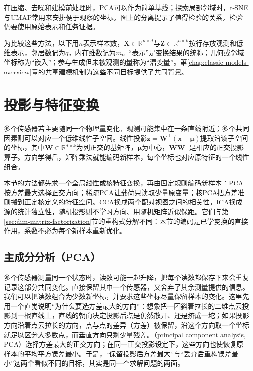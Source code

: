 在压缩、去噪和建模前处理时，PCA可以作为简单基线；探索局部邻域时，t-SNE与UMAP常用来安排便于观察的坐标。图上的分离提示了值得检验的关系，检验仍要使用原始表示和任务证据。

为比较这些方法，以下用$n$表示样本数，$\bm{X}\in\mathbb{R}^{n\times d}$与$\bm{Z}\in\mathbb{R}^{n\times k}$按行存放观测和低维表示，邻居数记为$q$，内在维数记为$m$。“表示”是变换结果的统称；几何或邻域坐标称为“嵌入”；参与生成但未被观测的量称为“潜变量”。第\ref{chap:classic-models-overview}章的共享建模机制为这些不同目标提供了共同背景。

\section{投影与特征变换}
\label{sec:dim-linear}

多个传感器若主要随同一个物理量变化，观测可能集中在一条直线附近；多个共同因素则可以对应一个低维线性子空间。线性投影$\bm{z}=\bm{W}^{\top}(\bm{x}-\bm{\mu})$提取沿该子空间的坐标，其中$\bm{W}\in\mathbb{R}^{d\times k}$为列正交的基矩阵，$\bm{\mu}$为中心，$\bm{W}\bm{W}^{\top}$是相应的正交投影算子。方向学得后，矩阵乘法就能编码新样本，每个坐标也对应原特征的一个线性组合。

本节的方法都先求一个全局线性或核特征变换，再由固定规则编码新样本：PCA按方差最大选择正交方向；稀疏PCA让载荷只读取少量原变量；核PCA把方差准则搬到正定核定义的特征空间。CCA换成两个配对视图之间的相关性，ICA换成源的统计独立性，随机投影则不学习方向、用随机矩阵近似保距。它们与第\ref{sec:dim-matrix-factorization}节的重构式分解不同：本节的编码是已学变换的直接作用，系数不必为每个新样本重新优化。

\subsection{主成分分析（PCA）}
\label{sec:dim-pca}

多个传感器测量同一个状态时，读数可能一起升降，把每个读数都保存下来会重复记录这部分共同变化。直接保留其中一个传感器，又舍弃了其余测量提供的信息。我们可以把读数组合为少数新坐标，并要求这些坐标尽量保留样本的变化。这里先用一个直觉说明“为什么要选方差最大的方向”：想象把一团斜着拉长的二维点云投影到一根直线上，直线的朝向决定投影后点是仍然散开、还是挤成一坨；如果投影方向沿着点云拉长的方向，点与点的差异（方差）被保留，沿这个方向取一个坐标就足以区分大多数点，而垂直方向只剩少量残差。（principal component analysis, PCA）选择方差最大的正交方向；在同一正交投影设定下，这些方向也使恢复原样本的平均平方误差最小。于是，“保留投影后方差最大”与“丢弃后重构误差最小”这两个看似不同的目标，其实是同一个求解问题的两面。


